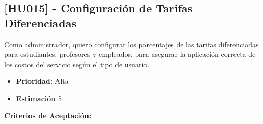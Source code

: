 \documentclass[12pt]{article}
\begin{document}
\pagebreak

\subsection{[HU015] - Configuración de Tarifas Diferenciadas}

Como administrador, quiero configurar los porcentajes de las tarifas diferenciadas para estudiantes, profesores y empleados, para asegurar la aplicación correcta de los costos del servicio según el tipo de usuario.

\begin{itemize}
	\item \textbf{Prioridad:} Alta
	\item \textbf{Estimación} 5
\end{itemize}

\textbf{Criterios de Aceptación:}
\end{document}
